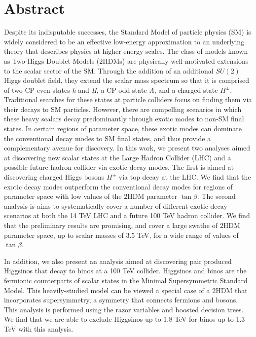 \chapter*{Abstract}
{}
Despite its indisputable successes, the Standard Model of particle physics (SM) is widely considered to be an effective low-energy approximation to an underlying theory that describes physics at higher energy scales. 
The class of models known as Two-Higgs Doublet Models ($2$HDMs) are physically well-motivated extensions to the scalar sector of the SM. Through the addition of an additional $SU(2)$ Higgs doublet field, they extend the scalar mass spectrum so that it is comprised of two CP-even states \emph{h} and \emph{H}, a CP-odd state \emph{A}, and a charged state $H^\pm$.
Traditional searches for these states at particle colliders focus on finding them via their decays to SM particles. However, there are compelling scenarios in which these heavy scalars decay predominantly through exotic modes to non-SM final states. In certain regions of parameter space, these exotic modes can dominate the conventional decay modes to SM final states, and thus provide a complementary avenue for discovery. In this work, we present two analyses aimed at discovering new scalar states at the Large Hadron Collider (LHC) and a possible future hadron collider via exotic decay modes. The first is aimed at discovering charged Higgs bosons $H^\pm$ via top decay at the LHC. We find that the exotic decay modes outperform the conventional decay modes for regions of parameter space with low values of the $2$HDM parameter $\tan\beta$. The second analysis is aims to systematically cover a number of different exotic decay scenarios at both the 14 TeV LHC and a future 100 TeV hadron collider. We find that the preliminary results are promising, and cover a large swathe of $2$HDM parameter space, up to scalar masses of 3.5 TeV, for a wide range of values of $\tan\beta$.

In addition, we also present an analysis aimed at discovering pair produced Higgsinos that decay to binos at a 100 TeV collider. Higgsinos and binos are the fermionic counterparts of scalar states in the Minimal Supersymmetric Standard Model. This heavily-studied model can be viewed a special case of a $2$HDM that incorporates supersymmetry, a symmetry that connects fermions and bosons. This analysis is performed using the razor variables and boosted decision trees. We find that we are able to exclude Higgsinos up to 1.8 TeV for binos up to 1.3 TeV with this analysis.
